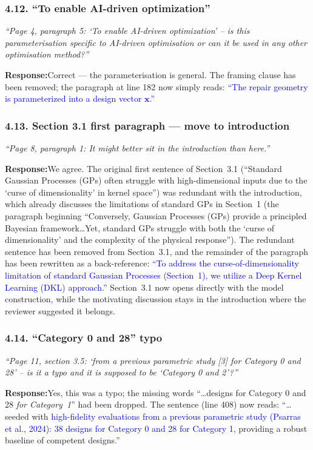\documentclass[11pt,a4paper]{article}
\newcommand{\new}[1]{\textcolor{blue}{#1}}
\newcommand{\rev}[1]{\par\noindent\textit{\small #1}\par\smallskip}
\newcommand{\resp}{\par\noindent\textbf{Response:}\space}
\begin{document}
\subsubsection*{4.12. ``To enable AI-driven optimization''}
\rev{``Page 4, paragraph 5: `To enable AI-driven optimization' -- is this parameterisation specific to AI-driven optimisation or can it be used in any other optimisation method?''}
\resp Correct --- the parameterisation is general. The framing clause has been removed; the paragraph at line 182 now simply reads: \new{``The repair geometry is parameterized into a design vector $\mathbf{x}$.''}

\subsubsection*{4.13. Section 3.1 first paragraph --- move to introduction}
\rev{``Page 8, paragraph 1: It might better sit in the introduction than here.''}
\resp We agree. The original first sentence of Section~3.1 (``Standard Gaussian Processes (GPs) often struggle with high-dimensional inputs due to the `curse of dimensionality' in kernel space'') was redundant with the introduction, which already discusses the limitations of standard GPs in Section~1 (the paragraph beginning ``Conversely, Gaussian Processes (GPs) provide a principled Bayesian framework\ldots Yet, standard GPs struggle with both the `curse of dimensionality' and the complexity of the physical response''). The redundant sentence has been removed from Section~3.1, and the remainder of the paragraph has been rewritten as a back-reference: \new{``To address the curse-of-dimensionality limitation of standard Gaussian Processes (Section~1), we utilize a Deep Kernel Learning (DKL) approach.''} Section~3.1 now opens directly with the model construction, while the motivating discussion stays in the introduction where the reviewer suggested it belongs.

\subsubsection*{4.14. ``Category 0 and 28'' typo}
\rev{``Page 11, section 3.5: `from a previous parametric study [3] for Category 0 and 28' -- is it a typo and it is supposed to be `Category 0 and 2'?''}
\resp Yes, this was a typo; the missing words ``\ldots designs for Category 0 and 28 \emph{for Category~1}'' had been dropped. The sentence (line 408) now reads: ``\ldots seeded with \new{high-fidelity evaluations from a previous parametric study (Psarras et al., 2024): 38 designs for Category 0 and 28 for Category 1,} providing a robust baseline of competent designs.''
\end{document}
